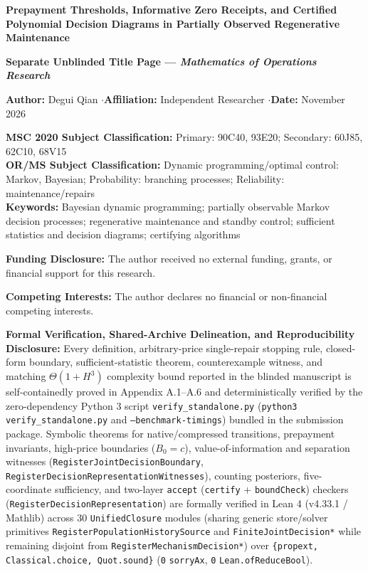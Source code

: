 \documentclass[11pt,letterpaper]{article}
\begin{document}
\pagestyle{empty}
\begin{center}
{\Large\bfseries Prepayment Thresholds, Informative Zero Receipts, and Certified Polynomial Decision Diagrams in Partially Observed Regenerative Maintenance\par}
\vspace{8pt}
{\normalsize\bfseries Separate Unblinded Title Page — \emph{Mathematics of Operations Research}\par}
\end{center}

\vspace{7pt}
\noindent\textbf{Author:} Degui Qian \quad$\cdot$\quad \textbf{Affiliation:} Independent Researcher \quad$\cdot$\quad \textbf{Date:} November 2026

\vspace{7pt}
\noindent\textbf{MSC 2020 Subject Classification:} Primary: 90C40, 93E20; Secondary: 60J85, 62C10, 68V15\\
\textbf{OR/MS Subject Classification:} Dynamic programming/optimal control: Markov, Bayesian; Probability: branching processes; Reliability: maintenance/repairs\\
\textbf{Keywords:} Bayesian dynamic programming; partially observable Markov decision processes; regenerative maintenance and standby control; sufficient statistics and decision diagrams; certifying algorithms

\vspace{7pt}
\noindent\textbf{Funding Disclosure:} The author received no external funding, grants, or financial support for this research.

\vspace{6pt}
\noindent\textbf{Competing Interests:} The author declares no financial or non-financial competing interests.

\vspace{6pt}
\noindent\textbf{Formal Verification, Shared-Archive Delineation, and Reproducibility Disclosure:} Every definition, arbitrary-price single-repair stopping rule, closed-form boundary, sufficient-statistic theorem, counterexample witness, and matching $\Theta(1 + H^3)$ complexity bound reported in the blinded manuscript is self-containedly proved in Appendix A.1--A.6 and deterministically verified by the zero-dependency Python 3 script \texttt{verify\_standalone.py} (\texttt{python3 verify\_standalone.py} and \texttt{--benchmark-timings}) bundled in the submission package. Symbolic theorems for native/compressed transitions, prepayment invariants, high-price boundaries ($B_0 = c$), value-of-information and separation witnesses (\texttt{RegisterJointDecisionBoundary}, \texttt{RegisterDecisionRepresentationWitnesses}), counting posteriors, five-coordinate sufficiency, and two-layer \texttt{accept} (\texttt{certify} + \texttt{boundCheck}) checkers (\texttt{RegisterDecisionRepresentation}) are formally verified in Lean 4 (v4.33.1 / Mathlib) across 30 \texttt{UnifiedClosure} modules (sharing generic store/solver primitives \texttt{RegisterPopulationHistorySource} and \texttt{FiniteJointDecision*} while remaining disjoint from \texttt{RegisterMechanismDecision*}) over \texttt{\{propext, Classical.choice, Quot.sound\}} (\texttt{0} \texttt{sorryAx}, \texttt{0} \texttt{Lean.ofReduceBool}).
\end{document}
